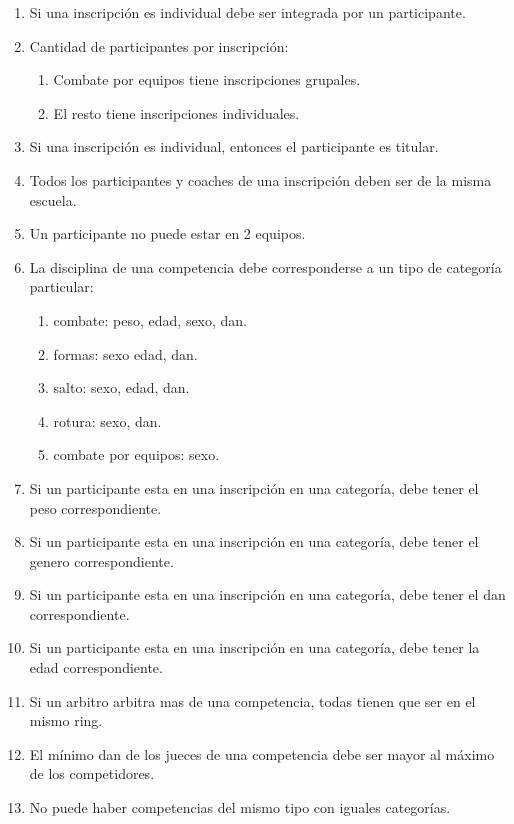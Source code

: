 \begin{enumerate}
  \item Si una inscripción es individual debe ser integrada por un participante.
  \item Cantidad de participantes por inscripción: \begin{enumerate}
    \item Combate por equipos tiene inscripciones grupales.
    \item El resto tiene inscripciones individuales. \end{enumerate}
  \item  Si una inscripción es individual, entonces el participante es titular.
  \item Todos los participantes y coaches de una inscripción deben ser de la misma escuela.
  \item Un participante no puede estar en 2 equipos.
  \item La disciplina de una competencia debe corresponderse a un tipo de categoría particular: \begin{enumerate}
    \item combate: peso, edad, sexo, dan.
    \item formas: sexo edad, dan.
    \item salto: sexo, edad, dan.
    \item rotura: sexo, dan.
    \item combate por equipos: sexo. \end{enumerate}
  \item Si un participante esta en una inscripción en una categoría, debe tener el peso correspondiente.
  \item Si un participante esta en una inscripción en una categoría, debe tener el genero correspondiente.
  \item Si un participante esta en una inscripción en una categoría, debe tener el dan correspondiente.
  \item Si un participante esta en una inscripción en una categoría, debe tener la edad correspondiente.
  \item Si un arbitro arbitra mas de una competencia, todas tienen que ser en el mismo ring.
  \item El mínimo dan de los jueces de una competencia debe ser mayor al máximo de los competidores.
  \item No puede haber competencias del mismo tipo con iguales categorías.
\end{enumerate}

